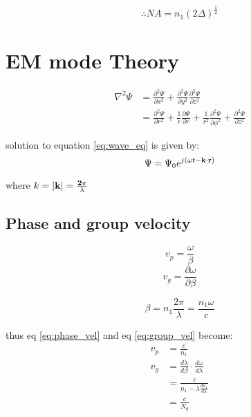 \documentclass[12pt, onecolumn]{article}
\begin{document}
        \begin{equation}
           \therefore NA = n_1 (2\Delta)^\frac{1}{2}
        \end{equation}

\section{EM mode Theory}
    \begin{equation}
        \begin{aligned}
            \nabla^2 \Psi &= \frac{\partial^2 \Psi}{\partial x^2} + \frac{\partial^2 \Psi}{\partial y^2} \frac{\partial^2 \Psi}{\partial z^2} \\
                &= \frac{\partial^2 \Psi}{\partial r^2} + \frac{1}{r} \frac{\partial \Psi}{\partial r} + \frac{1}{r^2} \frac{\partial^2 \Psi}{\partial \phi^2} + \frac{\partial^2 \Psi}{\partial z^2}
        \end{aligned}
        \label{eq:wave_eq}
    \end{equation}

    solution to equation \ref{eq:wave_eq} is given by:
    \begin{equation}
        \Psi = \Psi_0 e^{j(\omega t - \bf{k} \cdot \bf{r})}
        \label{eq:wave}
    \end{equation}

    where $k = |\bf{k}| = \frac{2\pi}{\lambda}$ 

    \subsection{Phase and group velocity}
        \begin{equation}
            v_p = \frac{\omega}{\beta}
            \label{eq:phase_vel}
        \end{equation}
        \begin{equation}
            v_g = \frac{\partial\omega}{\partial\beta}
            \label{eq:group_vel}
        \end{equation} 
    
        \begin{equation}
            \beta = n_1 \frac{2\pi}{\lambda} = \frac{n_1\omega}{c}
        \end{equation}

        thus eq \ref{eq:phase_vel} and eq \ref{eq:group_vel} become:
        \begin{equation}
            \boxed{\begin{aligned}
                    v_p &= \frac{c}{n_1} \\
                    v_g &= \frac{d\lambda}{d\beta} \cdot \frac{d\omega}{d\lambda} \\
                        &= \frac{c}{n_1 - \lambda  \displaystyle\frac{d n_1}{d\lambda}} \\
                        &= \frac{c}{N_g}
            \end{aligned}}
        \end{equation}
\end{document}
